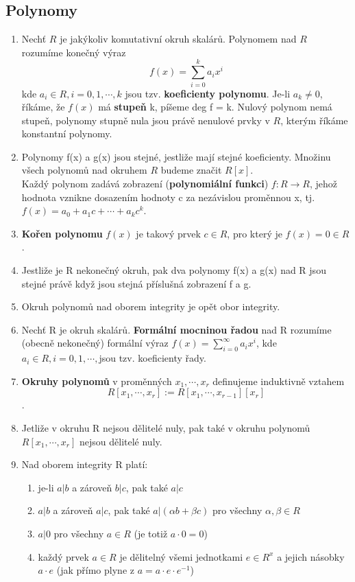 \documentclass[12pt,a4paper]{article}
\begin{document}
	\subsection{Polynomy}
	\begin{enumerate}
      \item Nechť $R$ je jakýkoliv komutativní okruh skalárů. Polynomem nad $R$ rozumíme konečný výraz
      \[f(x)=\sum_{i=0}^{k}a_ix^i\] kde $a_i \in R, i=0,1,\cdots,k$ jsou tzv. \textbf{koeficienty polynomu}. Je-li $a_k\neq0$, říkáme, že $f(x)$ má \textbf{stupeň} k, píšeme deg f = k. Nulový polynom nemá stupeň, polynomy stupně nula jsou právě nenulové prvky v $R$, kterým říkáme konstantní polynomy.

      \item Polynomy f(x) a g(x) jsou stejné, jestliže mají stejné koeficienty. Množinu všech polynomů nad okruhem $R$ budeme značit $R[x]$.\\Každý polynom zadává zobrazení (\textbf{polynomiální funkci}) $f:R\rightarrow R$, jehož hodnota vznikne dosazením hodnoty c za nezávislou proměnnou x, tj. $f(x)=a_0+a_1c+\cdots+a_kc^k$.

      \item \textbf{Kořen polynomu} $f(x)$ je takový prvek $c\in R$, pro který je $f(x) = 0\in R$.

      \item Jestliže je R nekonečný okruh, pak dva polynomy f(x) a g(x) nad R jsou stejné právě když jsou stejná příslušná zobrazení f a g.

      \item Okruh polynomů nad oborem integrity je opět obor integrity.
      
      \item Nechť R je okruh skalárů. \textbf{Formální mocninou řadou} nad R rozumíme (obecně nekonečný) formální výraz $f(x) = \sum_{i=0}^{\infty}a_ix^i$, kde $a_i \in R, i=0,1,\cdots,$jsou tzv. koeficienty řady.
      
      \item \textbf{Okruhy polynomů} v proměnných $x_1,\cdots,x_r$ definujeme induktivně vztahem 
      \[R[x_1,\cdots,x_r]:=R[x_1,\cdots,x_{r-1}][x_r]\]. 
      
      \item Jetliže v okruhu R nejsou dělitelé nuly, pak také v okruhu polynomů $R[x_1,\cdots,x_r]$ nejsou dělitelé nuly.
      
      \item Nad oborem integrity R platí:
      \begin{enumerate}
      	\item je-li $a|b$ a zároveň $b|c$, pak také $a|c$
      	\item $a|b$ a zároveň $a|c$, pak také $a|(\alpha b +\beta c)$ pro všechny $\alpha,\beta \in R$
      	\item $a|0$ pro všechny $a\in R$ (je totiž $a\cdot0=0$)
      	\item každý prvek $a \in R$ je dělitelný všemi jednotkami $e\in R^x$ a jejich násobky $a\cdot e$ (jak přímo plyne z $a=a\cdot e\cdot e^{-1}$)
      \end{enumerate}
      

\end{enumerate}
\end{document}
